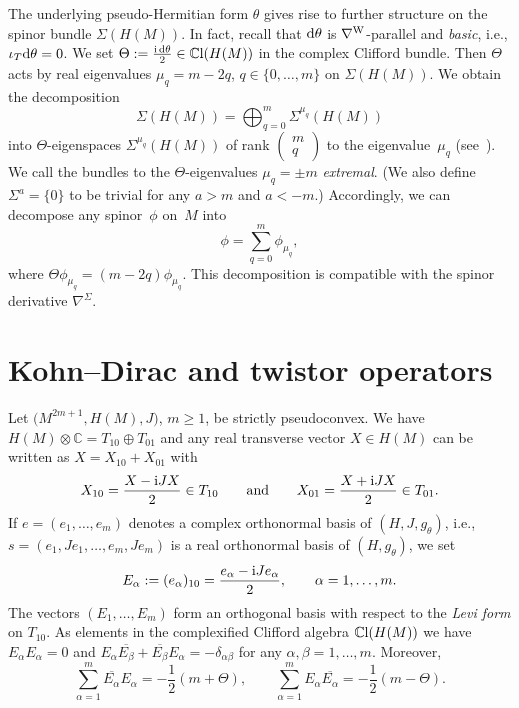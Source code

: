 \documentclass[10pt,a4paper]{amsart}
\numberwithin{equation}{section}
\newcommand{\CC}{\mathbb{C}}
\begin{document}
The underlying pseudo-Hermitian form $\theta$ gives rise to further structure on the spinor bundle $\Sigma(H(M))$.
In fact, recall that ${\rm d}\theta$ is $\nabla^{\rm W}$-parallel and {\em basic}, i.e., $\iota_T{\rm d}\theta=0$.
We set $\Theta:=\frac{{\rm i}\,{\rm d}\theta}{2}\in \CC{\rm l}(H(M))$ in the complex Clifford bundle. Then
$\Theta$ acts by real eigenvalues $\mu_q=m-2q$, $q\in\{0,\dots,m\}$ on $\Sigma(H(M))$. We obtain
the decomposition
\[
\Sigma(H(M)) = \bigoplus_{q=0}^m \Sigma^{\mu_q}(H(M))
\]
into $\Theta$-eigenspaces $\Sigma^{\mu_q}(H(M))$ of rank
$\left( \begin{smallmatrix} m\\ q\end{smallmatrix}\right)$ to the eigenvalue~$\mu_q$ (see~\cite{Pet}).
We call the bundles to the $\Theta$-eigenvalues $\mu_q=\pm m$ {\em extremal}.
(We also define $\Sigma^{a}=\{0\}$ to be trivial for any $a>m$ and $a<-m$.)
Accordingly, we can decompose any spinor~$\phi$ on~$M$
into
\[
\phi = \sum_{q=0}^m \phi_{\mu_q},
\]
where $\Theta\phi_{\mu_q}=(m-2q)\phi_{\mu_q}$. This decomposition is compatible with the spinor derivative $\nabla^\Sigma$.

\section{Kohn--Dirac and twistor operators} \label{Sec6}

Let $\big(M^{2m+1},H(M),J\big)$, $m\geq 1$, be strictly pseudoconvex. We have
$H(M)\otimes\CC=T_{10}\oplus T_{01}$ and any real transverse vector $X\in H(M)$ can be written as $X=X_{10}+X_{01}$ with
\[
X_{10}= \frac{X-{\rm i}JX}{2}\in T_{10}\qquad \mbox{and}\qquad X_{01}=\frac{X+{\rm i}JX}{2}\in T_{01}.
\]
If $e=(e_1,\dots,e_m)$ denotes a complex orthonormal basis of $(H,J,g_\theta)$, i.e., $s=(e_1,Je_1,\dots,e_m,\allowbreak Je_m)$ is a real orthonormal basis of $(H,g_\theta)$,
we set \[E_\alpha := (e_\alpha)_{10} = \frac{e_\alpha-{\rm i}Je_\alpha}{2},\qquad\alpha=1,\dots,m.\]
The vectors $(E_1,\dots,E_m)$ form an orthogonal basis with respect to the {\em Levi form} on $T_{10}$.
As elements in the complexified Clifford algebra $\CC{\rm l}(H(M))$ we have $E_\alpha E_\alpha=0$ and $E_\alpha\overline{E_\beta}+\overline{E_\beta}E_\alpha=-\delta_{\alpha\beta}$
for any $\alpha,\beta=1,\dots,m$. Moreover,
\begin{equation*}%
\sum_{\alpha=1}^m \overline{E_\alpha}E_\alpha = -\frac{1}{2}(m+\Theta),\qquad
\sum_{\alpha=1}^m E_\alpha\overline{E_\alpha} = -\frac{1}{2}(m-\Theta).
\end{equation*}
\end{document}
